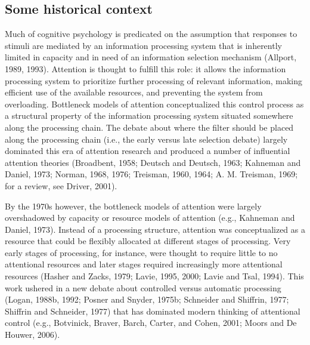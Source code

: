 \documentclass[]{DissertateCUNY}
\begin{document}
\hypertarget{some-historical-context}{%
\subsection{Some historical context}\label{some-historical-context}}

Much of cognitive psychology is predicated on the assumption that
responses to stimuli are mediated by an information processing system
that is inherently limited in capacity and in need of an information
selection mechanism (Allport, 1989, 1993). Attention is thought to
fulfill this role: it allows the information processing system to
prioritize further processing of relevant information, making efficient
use of the available resources, and preventing the system from
overloading. Bottleneck models of attention conceptualized this control
process as a structural property of the information processing system
situated somewhere along the processing chain. The debate about where
the filter should be placed along the processing chain (i.e., the early
versus late selection debate) largely dominated this era of attention
research and produced a number of influential attention theories
(Broadbent, 1958; Deutsch and Deutsch, 1963; Kahneman and Daniel, 1973;
Norman, 1968, 1976; Treisman, 1960, 1964; A. M. Treisman, 1969; for a
review, see Driver, 2001).

By the 1970s however, the bottleneck models of attention were largely
overshadowed by capacity or resource models of attention (e.g., Kahneman
and Daniel, 1973). Instead of a processing structure, attention was
conceptualized as a resource that could be flexibly allocated at
different stages of processing. Very early stages of processing, for
instance, were thought to require little to no attentional resources and
later stages required increasingly more attentional resources (Hasher
and Zacks, 1979; Lavie, 1995, 2000; Lavie and Tsal, 1994). This work
ushered in a new debate about controlled versus automatic processing
(Logan, 1988b, 1992; Posner and Snyder, 1975b; Schneider and Shiffrin,
1977; Shiffrin and Schneider, 1977) that has dominated modern thinking
of attentional control (e.g., Botvinick, Braver, Barch, Carter, and
Cohen, 2001; Moors and De Houwer, 2006).
\end{document}

